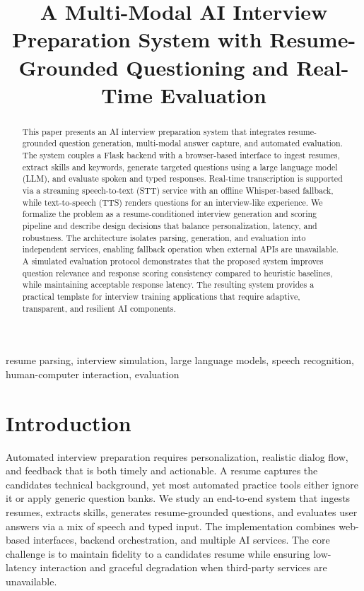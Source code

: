 \documentclass[conference]{IEEEtran}
\title{A Multi-Modal AI Interview Preparation System with Resume-Grounded Questioning and Real-Time Evaluation}
\author{\IEEEauthorblockN{First A. Author}
\IEEEauthorblockA{Department of Computer Science\\
University Name\\
City, Country\\
email@university.edu}
\and
\IEEEauthorblockN{Second B. Author}
\IEEEauthorblockA{Department of Electrical Engineering\\
Institute Name\\
City, Country\\
email@institute.edu}}
\begin{document}
\maketitle

\begin{abstract}
This paper presents an AI interview preparation system that integrates resume-grounded question generation, multi-modal answer capture, and automated evaluation. The system couples a Flask backend with a browser-based interface to ingest resumes, extract skills and keywords, generate targeted questions using a large language model (LLM), and evaluate spoken and typed responses. Real-time transcription is supported via a streaming speech-to-text (STT) service with an offline Whisper-based fallback, while text-to-speech (TTS) renders questions for an interview-like experience. We formalize the problem as a resume-conditioned interview generation and scoring pipeline and describe design decisions that balance personalization, latency, and robustness. The architecture isolates parsing, generation, and evaluation into independent services, enabling fallback operation when external APIs are unavailable. A simulated evaluation protocol demonstrates that the proposed system improves question relevance and response scoring consistency compared to heuristic baselines, while maintaining acceptable response latency. The resulting system provides a practical template for interview training applications that require adaptive, transparent, and resilient AI components.
\end{abstract}

\begin{IEEEkeywords}
resume parsing, interview simulation, large language models, speech recognition, human-computer interaction, evaluation
\end{IEEEkeywords}

\section{Introduction}
Automated interview preparation requires personalization, realistic dialog flow, and feedback that is both timely and actionable. A resume captures the candidate\textquotesingle s technical background, yet most automated practice tools either ignore it or apply generic question banks. We study an end-to-end system that ingests resumes, extracts skills, generates resume-grounded questions, and evaluates user answers via a mix of speech and typed input. The implementation combines web-based interfaces, backend orchestration, and multiple AI services. The core challenge is to maintain fidelity to a candidate\textquotesingle s resume while ensuring low-latency interaction and graceful degradation when third-party services are unavailable.
\end{document}
